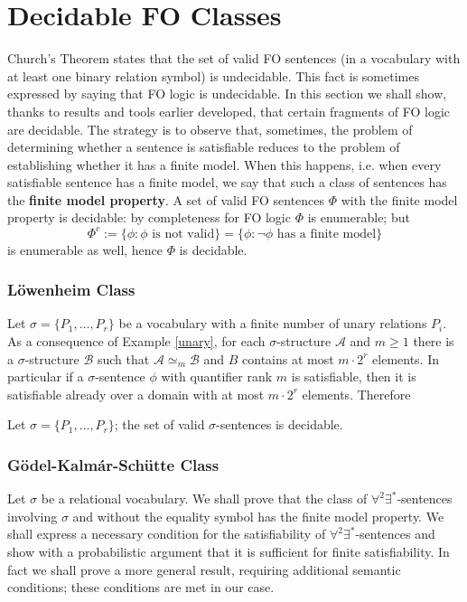 \section{Decidable FO Classes}%

Church's Theorem states that the set of valid FO sentences (in a vocabulary with at least one binary relation symbol) is undecidable. 
This fact is sometimes expressed by saying that FO logic is undecidable. 
In this section we shall show, thanks to results and tools earlier developed, that certain fragments of FO logic are decidable. 
The strategy is to observe that, sometimes, the problem of determining whether a sentence is satisfiable reduces to the problem of establishing whether it has a finite model. 
When this happens, i.e. when every satisfiable sentence has a finite model, we say that such a class of sentences has the \textbf{finite model property}. 
A set of valid FO sentences $\Phi$ with the finite model property is decidable: by completeness for FO logic $\Phi$ is enumerable; but $$\Phi^c:=\{ \phi : \phi \text{ is not valid}\}=\{\phi: \lnot \phi \text{ has a finite model}\}$$ is enumerable as well, hence $\Phi$ is decidable. 

\subsubsection{L\"owenheim Class}

Let $\sigma=\{ P_1, \ldots, P_r\}$ be a vocabulary with a finite number of unary relations $P_i$. 
As a consequence of Example \ref{unary}, for each $\sigma$-structure $\mathcal{A}$ and $m \ge 1$ there is a $\sigma$-structure $\mathcal{B}$ such that $\mathcal{A} \simeq_m \mathcal{B}$ and $B$ contains at most $m \cdot 2^r$ elements. 
In particular if a $\sigma$-sentence $\phi$ with quantifier rank $m$ is satisfiable, then it is satisfiable already over a domain with at most $m \cdot 2^r$ elements. 
Therefore 

\begin{thm} Let $\sigma=\{ P_1, \ldots, P_r\}$; the set of valid $\sigma$-sentences is decidable.

\end{thm}

\subsubsection{G\"odel-Kalm\'ar-Sch\"utte Class}
Let $\sigma$ be a relational vocabulary. We shall prove that the class of $\forall^2 \exists^{\ast}$-sentences involving $\sigma$ and without the equality symbol has the finite model property. 
We shall express a necessary condition for the satisfiability of $\forall^2 \exists^{\ast}$-sentences and show with a probabilistic argument that it is sufficient for finite satisfiability. 
In fact we shall prove a more general result, requiring additional semantic conditions; these conditions are met in our case.  

